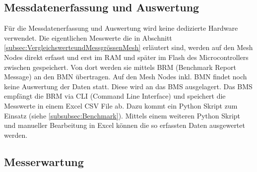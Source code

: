 \subsection{Messdatenerfassung und Auswertung}\label{subsec:MessdatenerfassungundAuswertung}

Für die Messdatenerfassung und Auswertung wird keine dedizierte Hardware verwendet. Die eigentlichen Messwerte die in Abschnitt \ref{subsec:VergleichswerteundMessgrössenMesh} erläutert sind, werden auf den Mesh Nodes direkt erfasst und erst im RAM und später im Flash des Microcontrollers zwischen gespeichert. Von dort werden sie mittels BRM (Benchmark Report Message) an den BMN übertragen.
Auf den Mesh Nodes inkl. BMN findet noch keine Auswertung der Daten statt.
Diese wird an das BMS ausgelagert.
Das BMS empfängt die BRM via CLI (Command Line Interface) und speichert die Messwerte in einem Excel CSV File ab. Dazu kommt ein Python Skript zum Einsatz (siehe \ref{subsubsec:Benchmark}).
Mittels einem weiteren Python Skript und manueller Bearbeitung in Excel können die so erfassten Daten ausgewertet werden.

\subsection{Messerwartung}\label{subsec:Messerwartung}

